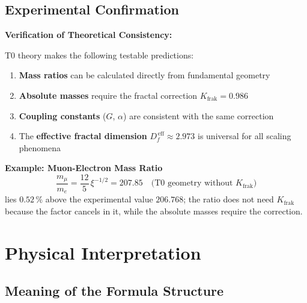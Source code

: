 	\subsection{Experimental Confirmation}
	
	\begin{verification}
		\textbf{Verification of Theoretical Consistency:}
		
		T0 theory makes the following testable predictions:
		
		\begin{enumerate}
			\item \textbf{Mass ratios} can be calculated directly from fundamental geometry
			\item \textbf{Absolute masses} require the fractal correction $K_{\text{frak}} = 0.986$
			\item \textbf{Coupling constants} ($G$, $\alpha$) are consistent with the same correction
			\item The \textbf{effective fractal dimension} $D_f^{\,\text{eff}} \approx 2.973$ is universal for all scaling phenomena
		\end{enumerate}
		
		\textbf{Example: Muon-Electron Mass Ratio}
		\begin{equation}
			\frac{m_\mu}{m_e} = \frac{12}{5}\,\xi^{-1/2} = 207.85 \quad \text{(T0 geometry without $K_{\text{frak}}$)}
		\end{equation}
		lies $0.52\,\%$ above the experimental value $206.768$; the ratio does not need $K_{\text{frak}}$ because the factor cancels in it, while the absolute masses require the correction.
	\end{verification}
	
	\section{Physical Interpretation}
	
	\subsection{Meaning of the Formula Structure}
	
